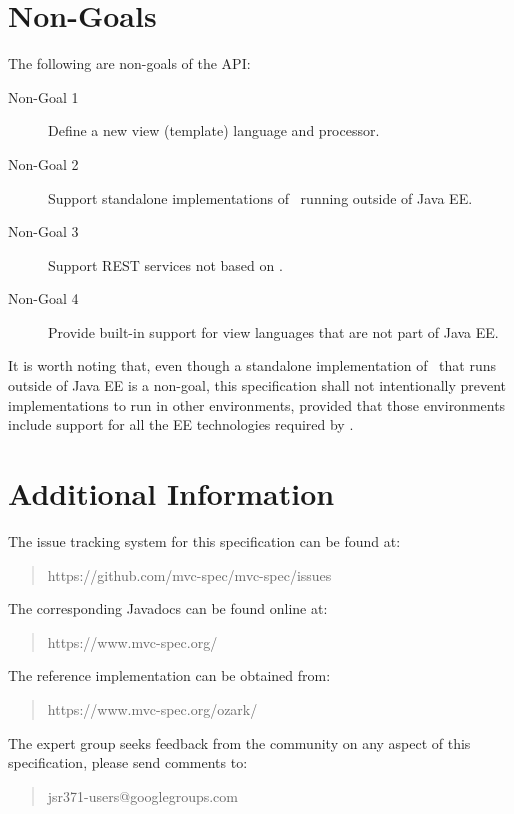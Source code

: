 \section{Non-Goals}
\label{non_goals}

The following are non-goals of the API:

\begin{description}
\item[Non-Goal 1] Define a new view (template) language and processor.
\item[Non-Goal 2] Support standalone implementations of \mvc\ running outside of Java EE.
\item[Non-Goal 3] Support REST services not based on \jaxrs.
\item[Non-Goal 4] Provide built-in support for view languages that are not part of Java EE.
\end{description}

It is worth noting that, even though a standalone implementation of \mvc\ that runs outside
of Java EE is a non-goal, this specification shall not intentionally prevent implementations
to run in other environments, provided that those environments include support for all the 
EE technologies required by \mvc.

\section{Additional Information}
\label{additional_information}

The issue tracking system for this specification can be found at:

\begin{quote}
https://github.com/mvc-spec/mvc-spec/issues
\end{quote}

The corresponding Javadocs can be found online at:

\begin{quote}
https://www.mvc-spec.org/
\end{quote}

The reference implementation can be obtained from:

\begin{quote}
https://www.mvc-spec.org/ozark/
\end{quote}

The expert group seeks feedback from the community on any aspect of this specification, please 
send comments to:

\begin{quote}
jsr371-users@googlegroups.com
\end{quote}

